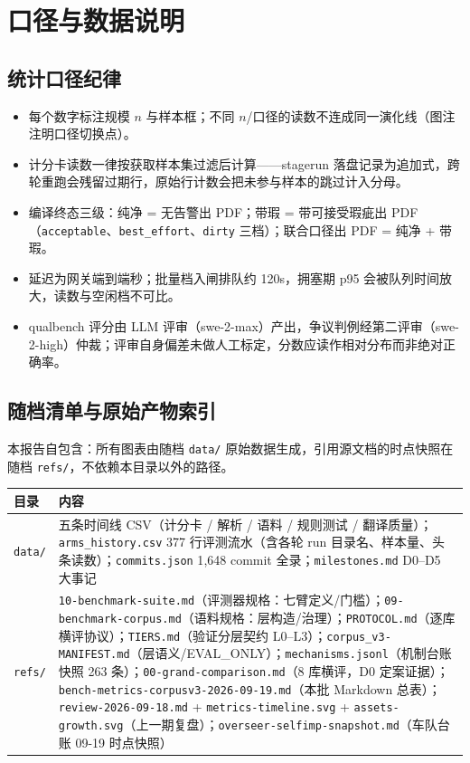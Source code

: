 \appendix
\section{口径与数据说明}

\subsection{统计口径纪律}

\begin{itemize}
  \item 每个数字标注规模 $n$ 与样本框；不同 $n$/口径的读数不连成同一演化线（图注注明口径切换点）。
  \item 计分卡读数一律按获取样本集过滤后计算——stagerun 落盘记录为追加式，跨轮重跑会残留过期行，原始行计数会把未参与样本的跳过计入分母。
  \item 编译终态三级：纯净 = 无告警出 PDF；带瑕 = 带可接受瑕疵出 PDF（\texttt{acceptable}、\texttt{best\_effort}、\texttt{dirty} 三档）；联合口径出 PDF = 纯净 + 带瑕。
  \item 延迟为网关端到端秒；批量档入闸排队约 120s，拥塞期 p95 会被队列时间放大，读数与空闲档不可比。
  \item qualbench 评分由 LLM 评审（swe-2-max）产出，争议判例经第二评审（swe-2-high）仲裁；评审自身偏差未做人工标定，分数应读作相对分布而非绝对正确率。
\end{itemize}

\subsection{随档清单与原始产物索引}

本报告自包含：所有图表由随档 \texttt{data/} 原始数据生成，引用源文档的时点快照在随档 \texttt{refs/}，不依赖本目录以外的路径。

\begin{center}\small
\begin{tabular}{@{}l>{\raggedright\arraybackslash}p{10.6cm}@{}}
\toprule
目录 & 内容 \\
\midrule
\texttt{data/} & 五条时间线 CSV（计分卡 / 解析 / 语料 / 规则测试 / 翻译质量）；\texttt{arms\_history.csv} 377 行评测流水（含各轮 run 目录名、样本量、头条读数）；\texttt{commits.json} 1{,}648 commit 全录；\texttt{milestones.md} D0--D5 大事记 \\
\midrule
\texttt{refs/} & \texttt{10-benchmark-suite.md}（评测器规格：七臂定义/门槛）；\texttt{09-benchmark-corpus.md}（语料规格：层构造/治理）；\texttt{PROTOCOL.md}（逐库横评协议）；\texttt{TIERS.md}（验证分层契约 L0--L3）；\texttt{corpus\_v3-MANIFEST.md}（层语义/EVAL\_ONLY）；\texttt{mechanisms.jsonl}（机制台账快照 263 条）；\texttt{00-grand-comparison.md}（8 库横评，D0 定案证据）；\texttt{bench-metrics-corpusv3-2026-09-19.md}（本批 Markdown 总表）；\texttt{review-2026-09-18.md} + \texttt{metrics-timeline.svg} + \texttt{assets-growth.svg}（上一期复盘）；\texttt{overseer-selfimp-snapshot.md}（车队台账 09-19 时点快照） \\
\bottomrule
\end{tabular}
\end{center}

